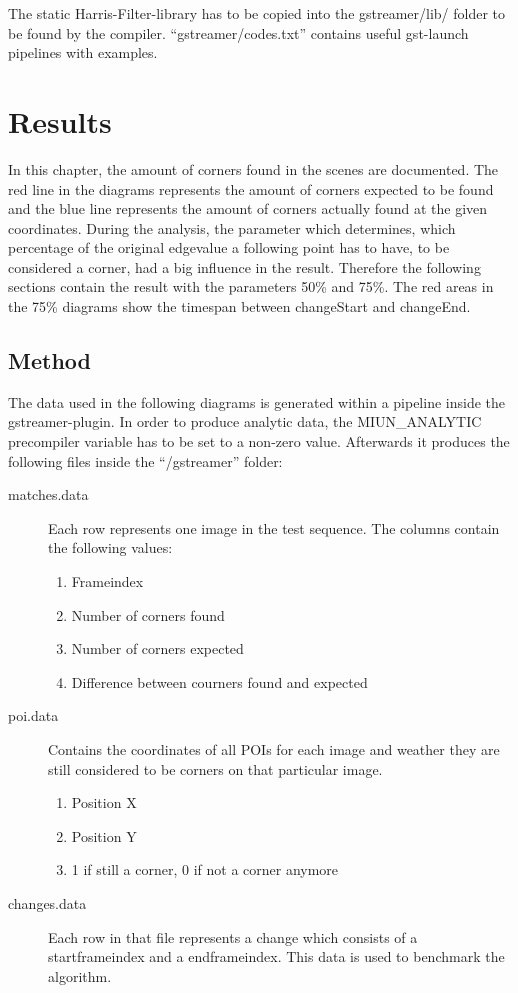 The static Harris-Filter-library has to be copied into the gstreamer/lib/ folder  to be found by the compiler. \enquote{gstreamer/codes.txt} contains useful gst-launch pipelines with examples.

\chapter{Results}
In this chapter, the amount of corners found in the scenes are documented. The red line in the diagrams represents the amount of corners expected to be found and the blue line represents the amount of corners actually found at the given coordinates. During the analysis, the parameter which determines, which percentage of the original edgevalue a following point has to have, to be considered a corner, had a big influence in the result. Therefore the following sections contain the result with the parameters 50\% and 75\%. The red areas in the 75\% diagrams show the timespan between changeStart and changeEnd.

\section{Method}
The data used in the following diagrams is generated within a pipeline inside the gstreamer-plugin. In order to produce analytic data, the MIUN\_ANALYTIC precompiler variable has to be set to a non-zero value. Afterwards it produces the following files inside the \enquote{/gstreamer} folder:
\begin{description}
	\item[matches.data] 
	Each row represents one image in the test sequence. The columns contain the following values:
	\begin{enumerate}
			\item{Frameindex}
			\item{Number of corners found}
			\item{Number of corners expected}
			\item{Difference between courners found and expected}
	\end{enumerate}
	\item[poi.data] 
		Contains the coordinates of all POIs for each image and weather they are still considered to be corners on that particular image.
			\begin{enumerate}
			\item{Position X}
			\item{Position Y}
			\item{1 if still a corner, 0 if not a corner anymore}
		\end{enumerate}
		 
	\item[changes.data] 
		Each row in that file represents a change which consists of a startframeindex and a endframeindex. This data is used to benchmark the algorithm.
\end{description}

